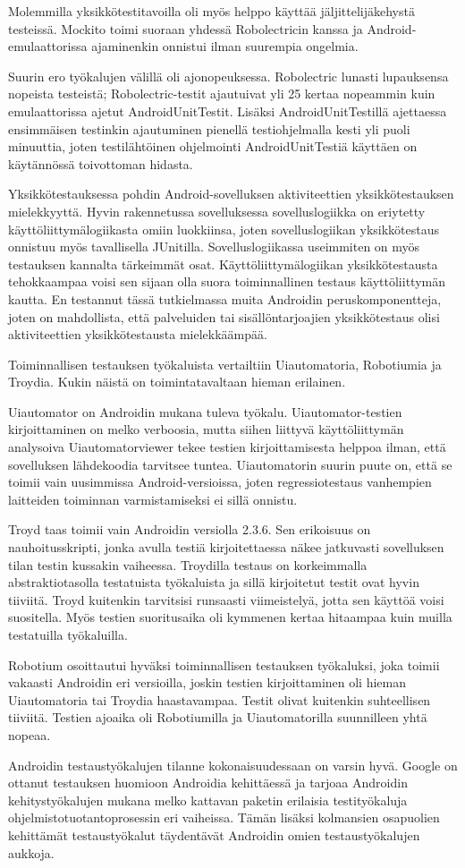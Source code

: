 Molemmilla yksikkötestitavoilla oli myös helppo käyttää jäljittelijäkehystä testeissä. Mockito toimi suoraan yhdessä Robolectricin kanssa ja Android-emulaattorissa ajaminenkin onnistui ilman suurempia ongelmia.

Suurin ero työkalujen välillä oli ajonopeuksessa. Robolectric lunasti lupauksensa nopeista testeistä; Robolectric-testit ajautuivat yli 25 kertaa nopeammin kuin emulaattorissa ajetut AndroidUnitTestit. Lisäksi AndroidUnitTestillä ajettaessa ensimmäisen testinkin ajautuminen pienellä testiohjelmalla kesti yli puoli minuuttia, joten testilähtöinen ohjelmointi AndroidUnitTestiä käyttäen on käytännössä toivottoman hidasta.

Yksikkötestauksessa pohdin Android-sovelluksen aktiviteettien yksikkötestauksen mielekkyyttä. Hyvin rakennetussa sovelluksessa sovelluslogiikka on eriytetty käyttöliittymälogiikasta omiin luokkiinsa, joten sovelluslogiikan yksikkötestaus onnistuu myös tavallisella JUnitilla. Sovelluslogiikassa useimmiten on myös testauksen kannalta tärkeimmät osat. Käyttöliittymälogiikan yksikkötestausta tehokkaampaa voisi sen sijaan olla suora toiminnallinen testaus käyttöliittymän kautta. En testannut tässä tutkielmassa muita Androidin peruskomponentteja, joten on mahdollista, että palveluiden tai sisällöntarjoajien yksikkötestaus olisi aktiviteettien yksikkötestausta mielekkäämpää.

Toiminnallisen testauksen työkaluista vertailtiin Uiautomatoria, Robotiumia ja Troydia. Kukin näistä on toimintatavaltaan hieman erilainen. 

Uiautomator on Androidin mukana tuleva työkalu. Uiautomator-testien kirjoittaminen on melko verboosia, mutta siihen liittyvä käyttöliittymän analysoiva Uiautomatorviewer tekee testien kirjoittamisesta helppoa ilman, että sovelluksen lähdekoodia tarvitsee tuntea. Uiautomatorin suurin puute on, että se toimii vain uusimmissa Android-versioissa, joten regressiotestaus vanhempien laitteiden toiminnan varmistamiseksi ei sillä onnistu.

Troyd taas toimii vain Androidin versiolla 2.3.6. Sen erikoisuus on nauhoitusskripti, jonka avulla testiä kirjoitettaessa näkee jatkuvasti sovelluksen tilan testin kussakin vaiheessa. Troydilla testaus on korkeimmalla abstraktiotasolla testatuista työkaluista ja sillä kirjoitetut testit ovat hyvin tiiviitä. Troyd kuitenkin tarvitsisi runsaasti viimeistelyä, jotta sen käyttöä voisi suositella. Myös testien suoritusaika oli kymmenen kertaa hitaampaa kuin muilla testatuilla työkaluilla.

Robotium osoittautui hyväksi toiminnallisen testauksen työkaluksi, joka toimii vakaasti Androidin eri versioilla, joskin testien kirjoittaminen oli hieman Uiautomatoria tai Troydia haastavampaa. Testit olivat kuitenkin suhteellisen tiiviitä. Testien ajoaika oli Robotiumilla ja Uiautomatorilla suunnilleen yhtä nopeaa. 

Androidin testaustyökalujen tilanne kokonaisuudessaan on varsin hyvä. Google on ottanut testauksen huomioon Androidia kehittäessä ja tarjoaa Androidin kehitystyökalujen mukana melko kattavan paketin erilaisia testityökaluja ohjelmistotuotantoprosessin eri vaiheissa. Tämän lisäksi kolmansien osapuolien kehittämät testaustyökalut täydentävät Androidin omien testaustyökalujen aukkoja.